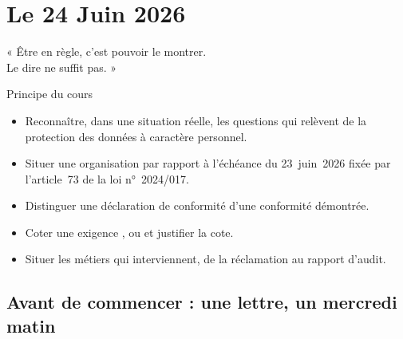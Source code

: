 
\chapter{Le 24 Juin 2026}
\label{chap:prologue}

\epigraph{%
    « Être en règle, c'est pouvoir le montrer.\\
    Le dire ne suffit pas. »%
}{Principe du cours}


\begin{boxobjectifs}
\begin{itemize}
    \item Reconnaître, dans une situation réelle, les questions qui relèvent
          de la protection des données à caractère personnel.
    \item Situer une organisation par rapport à l'échéance du 23~juin~2026
          fixée par l'article~73 de la loi n°~2024/017.
    \item Distinguer une déclaration de conformité d'une conformité
          démontrée.
    \item Coter une exigence \OUI{}, \NON{} ou \NEK{} et justifier la cote.
    \item Situer les métiers qui interviennent, de la réclamation au
          rapport d'audit.
\end{itemize}
\end{boxobjectifs}

\bigskip

\section*{Avant de commencer : une lettre, un mercredi matin}

